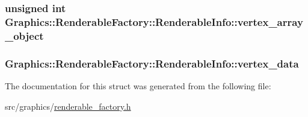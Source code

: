 \subsubsection[{vertex\+\_\+array\+\_\+object}]{\setlength{\rightskip}{0pt plus 5cm}unsigned int Graphics\+::\+Renderable\+Factory\+::\+Renderable\+Info\+::vertex\+\_\+array\+\_\+object}\label{struct_graphics_1_1_renderable_factory_1_1_renderable_info_a61188b98760e4fb1e49f52a58a1ad52e}
\hypertarget{struct_graphics_1_1_renderable_factory_1_1_renderable_info_ae8b3c7fd7d012a24ce61dc878503500c}{}
\subsubsection[{vertex\+\_\+data}]{ Graphics\+::\+Renderable\+Factory\+::\+Renderable\+Info\+::vertex\+\_\+data}\label{struct_graphics_1_1_renderable_factory_1_1_renderable_info_ae8b3c7fd7d012a24ce61dc878503500c}


The documentation for this struct was generated from the following file\+:\begin{DoxyCompactItemize}
\item 
src/graphics/\hyperlink{renderable__factory_8h}{renderable\+\_\+factory.\+h}\end{DoxyCompactItemize}
